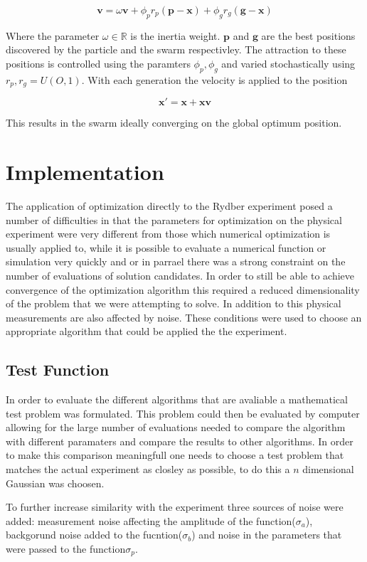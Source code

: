 \documentclass[a4paper,titlepage]{report}
\begin{document}
\[ \mathbf{v} = \omega \mathbf{v} + \phi_p r_p (\mathbf{p} - \mathbf{x}) + \phi_g r_g (\mathbf{g} - \mathbf{x}) \]

Where the parameter $\omega \in \mathbb{R}$ is the inertia weight. $\mathbf{p}$ and $\mathbf{g}$ are the best positions discovered by the particle and the swarm respectivley. The attraction to these positions is controlled using the paramters $\phi_p, \phi_g$ and varied stochastically using $r_p,r_g = U(O,1)$. With each generation the velocity is applied to the position

\[\mathbf{x}' = \mathbf{x} + \mathbf{x} \mathbf{v} \]

This results in the swarm ideally converging on the global optimum position.




\chapter{Implementation}

The application of optimization directly to the Rydber experiment posed a number of difficulties in that the parameters for optimization on the physical experiment were very different from those which numerical optimization is usually applied to, while it is possible to evaluate a numerical function or simulation very quickly and or in parrael there was a strong constraint on the number of evaluations of solution candidates. In order to still be able to achieve convergence of the optimization algorithm this required a reduced dimensionality of the problem that we were attempting to solve. In addition to this physical measurements are also affected by noise. These conditions were used to choose an appropriate algorithm that could be applied the the experiment.

\section{Test Function}
In order to evaluate the different algorithms that are avaliable a mathematical test problem was formulated. This problem could then be evaluated by computer allowing for the large number of evaluations needed to compare the algorithm with different paramaters and compare the results to other algorithms. In order to make this comparison meaningfull one needs to choose a test problem that matches the actual experiment as closley as possible, to do this a $n$ dimensional Gaussian was choosen.

To further increase similarity with the experiment three sources of noise were added: measurement noise affecting the amplitude of the function($\sigma_a$), backgorund noise added to the fucntion($\sigma_b$) and noise in the parameters that were passed to the function$\sigma_p$. 
\end{document}
